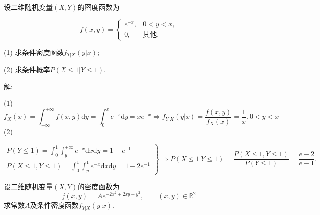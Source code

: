 \documentclass[standard]{ExBook}
\begin{document}
\begin{qitems}
\vspace{-5em}

    \begin{bbox}
    \begin{shaded}
        \qitem
设二维随机变量$(X,Y)$的密度函数为
\vspace{-2em}
\begin{center}
\begin{equation}
    f(x,y)=
    \left\{
    \begin{array}{cl}
        \nonumber
        e^{-x}, &0 < y < x,\\
        0, &\text{其他}.
    \end{array}
    \right.
\end{equation}
\end{center}
(1) 求条件密度函数$f_{Y|X}(y|x)$;

(2) 求条件概率$P(X\leq1|Y\leq1)$.
    \end{shaded}
    \end{bbox}

\vspace{-5em}

    \begin{bbox}
解: 

(1)
$$f_{X}(x)=\displaystyle\int_{-\infty}^{+\infty}f(x,y)\mathrm{d}y=\int_{0}^{x}e^{-x}\mathrm{d}y=x e^{-x} \Longrightarrow f_{Y|X}(y|x)=\displaystyle\frac{f(x,y)}{f_{X}(x)}=\frac{1}{x}.\ 0<y<x$$
(2)
\vspace{-2em}
\begin{center}
\begin{equation}
    \left.
    \begin{array}{r}
        \nonumber
        P(Y\leq 1)=\displaystyle\int_{0}^{1}\int_{y}^{+\infty}e^{-x}\mathrm{d}x\mathrm{d}y=1-e^{-1}\\
        P(X\leq1,Y\leq1)=\displaystyle\int_{0}^{1}\int_{y}^{1}e^{-x}\mathrm{d}x\mathrm{d}y=1-2e^{-1}
    \end{array}
    \right\}
    \Longrightarrow
    P(X\leq1|Y\leq1)=\displaystyle\frac{P(X\leq1,Y\leq1)}{P(Y\leq 1)}=\frac{e-2}{e-1}.
\end{equation}
\end{center}
    \end{bbox}

\vspace{-5em}

    \begin{bbox}
    \begin{shaded}
        \qitem
设二维随机变量$(X,Y)$的密度函数为
$$f(x,y)=A e^{-2x^2+2xy-y^2},\qquad (x,y)\in\mathbb{R}^2$$
求常数$A$及条件密度函数$f_{Y|X}(y|x)$.
    \end{shaded}
    \end{bbox}


\end{qitems}
\end{document}
